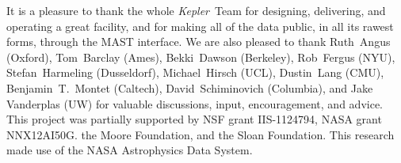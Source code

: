 \documentclass[12pt, preprint]{aastex}
\newcommand{\project}[1]{\textsl{#1}}
\newcommand{\Kepler}{\project{Kepler}}
\begin{document}
\acknowledgements
It is a pleasure to thank the whole \Kepler\ Team
  for designing, delivering, and operating a great facility,
  and for making all of the data public, in all its rawest forms, through the MAST interface.
We are also pleased to thank
  Ruth~Angus (Oxford),
  Tom~Barclay (Ames),
  Bekki~Dawson (Berkeley),
  Rob~Fergus (NYU),
  Stefan~Harmeling (Dusseldorf),
  Michael~Hirsch (UCL),
  Dustin~Lang (CMU),
  Benjamin~T.~Montet (Caltech),
  David~Schiminovich (Columbia),
  and
  Jake Vanderplas (UW)
for valuable discussions, input, encouragement, and advice.
This project was partially supported by
  NSF grant IIS-1124794,
  NASA grant NNX12AI50G.
  the Moore Foundation,
  and
  the Sloan Foundation.
This research made use of the NASA Astrophysics Data System.

\clearpage

%
\clearpage
\end{document}
